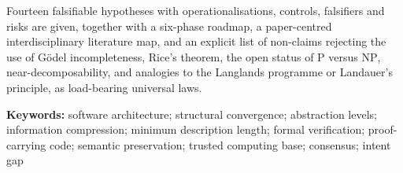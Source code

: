 \documentclass[UTF8,a4paper,11pt,openany,oneside]{ctexbook}
\begin{document}
Fourteen falsifiable hypotheses with operationalisations, controls, falsifiers and risks are
given, together with a six-phase roadmap, a paper-centred interdisciplinary literature map,
and an explicit list of non-claims rejecting the use of G\"odel incompleteness, Rice's
theorem, the open status of $\mathrm{P}$ versus $\mathrm{NP}$, near-decomposability, and
analogies to the Langlands programme or Landauer's principle, as load-bearing universal
laws.

\vspace{1em}
\noindent\textbf{Keywords:} software architecture; structural convergence; abstraction
levels; information compression; minimum description length; formal verification;
proof-carrying code; semantic preservation; trusted computing base; consensus;
intent gap

\tableofcontents
\listoftables

\mainmatter














\appendix





\backmatter

\end{document}
